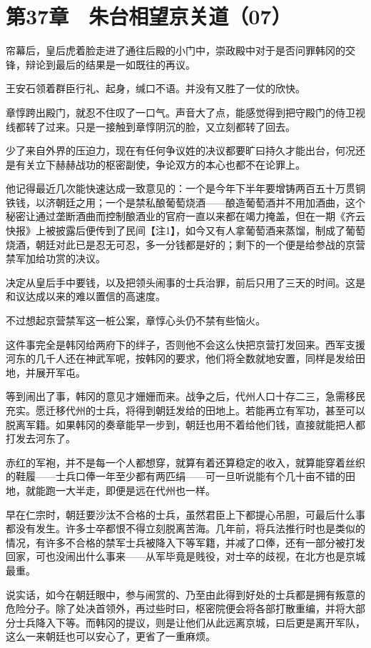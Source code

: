 \section{第37章　朱台相望京关道（07）}

帘幕后，皇后虎着脸走进了通往后殿的小门中，崇政殿中对于是否问罪韩冈的交锋，辩论到最后的结果是一如既往的再议。

王安石领着群臣行礼、起身，缄口不语。并没有又胜了一仗的欣快。

章惇跨出殿门，就忍不住叹了一口气。声音大了点，能感觉得到把守殿门的侍卫视线都转了过来。只是一接触到章惇阴沉的脸，又立刻都转了回去。

少了来自外界的压迫力，现在有任何争议姓的决议都要旷曰持久才能出台，何况还是有关立下赫赫战功的枢密副使，争论双方的本心也都不在论罪上。

他记得最近几次能快速达成一致意见的：一个是今年下半年要增铸两百五十万贯铜铁钱，以济朝廷之用；一个是禁私酿葡萄烧酒——酿造葡萄酒并不用加酒曲，这个秘密让通过垄断酒曲而控制酿酒业的官府一直以来都在竭力掩盖，但在一期《齐云快报》上被披露后便传到了民间【注1】，如今又有人拿葡萄酒来蒸馏，制成了葡萄烧酒，朝廷对此已是忍无可忍，多一分钱都是好的；剩下的一个便是给参战的京营禁军加给功赏的决议。

决定从皇后手中要钱，以及把领头闹事的士兵治罪，前后只用了三天的时间。这是和议达成以来的难以置信的高速度。

不过想起京营禁军这一桩公案，章惇心头仍不禁有些恼火。

这件事完全是韩冈给两府下的绊子，否则他不会这么快把京营打发回来。西军支援河东的几千人还在神武军呢，按韩冈的要求，他们将全数就地安置，同样是发给田地，并展开军屯。

等到闹出了事，韩冈的意见才姗姗而来。战争之后，代州人口十存二三，急需移民充实。愿迁移代州的士兵，将得到朝廷发给的田地上。若能再立有军功，甚至可以脱离军籍。如果韩冈的奏章能早一步到，朝廷也用不着给他们钱，直接就能把人都打发去河东了。

赤红的军袍，并不是每一个人都想穿，就算有着还算稳定的收入，就算能穿着丝织的鞋履——士兵口俸一年至少都有两匹绢——可一旦听说能有个几十亩不错的田地，就能跑一大半走，即便是远在代州也一样。

早在仁宗时，朝廷要沙汰不合格的士兵，虽然君臣上下都提心吊胆，可最后什么事都没有发生。许多士卒都恨不得立刻脱离苦海。几年前，将兵法推行时也是类似的情况，有许多不合格的禁军士兵被降入下等军籍，并减了口俸，还有一部分被打发回家，可也没闹出什么事来——从军毕竟是贱役，对士卒的歧视，在北方也是京城最重。

说实话，如今在朝廷眼中，参与闹赏的、乃至由此得到好处的士兵都是拥有叛意的危险分子。除了处决首领外，再过些时曰，枢密院便会将各部打散重编，并将大部分士兵降入下等。而韩冈的提议，则是让他们从此远离京城，曰后更是离开军队，这么一来朝廷也可以安心了，更省了一重麻烦。

